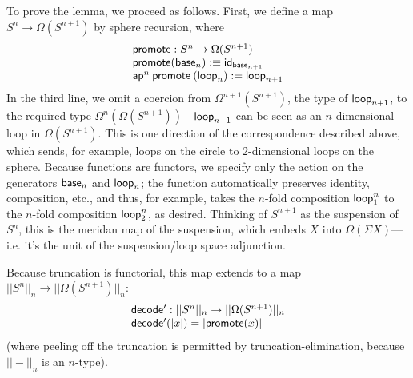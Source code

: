 To prove the lemma, we proceed as follows.  First, we define a map $S^n \to
\Omega(S^{n+1})$ by sphere recursion, where 
\[
\begin{array}{l}
\mathsf{promote} : S^n \to \Omega(S^{n+1}) \\
\mathsf{promote}(\mathsf{base}_n) :\equiv \mathsf{id}_{\mathsf{base}_{n+1}} \\
\mathsf{ap}^n \: \mathsf{promote} \: (\mathsf{loop}_n) := \mathsf{loop}_{n+1}
\end{array}
\]
In the third line, we omit a coercion from $\Omega^{n+1}(S^{n+1})$, the type
of $\mathsf{loop}_{n+1}$, to the required type $\Omega^n(\Omega(S^{n+1}))$---$\mathsf{loop}_{n+1}$ can be seen
as an $n$-dimensional loop in $\Omega(S^{n+1})$.
This is one direction of the correspondence described above, which
sends, for example, loops on the circle to 2-dimensional loops on the
sphere.  Because functions are functors, we specify only the action on
the generators $\mathsf{base}_n$ and $\mathsf{loop}_n$; the function automatically
preserves identity, composition, etc., and thus, for example, takes the $n$-fold
composition $\mathsf{loop}_1^n$ to the $n$-fold composition
$\mathsf{loop}_2^n$, as desired.  Thinking of $S^{n+1}$ as the
suspension of $S^n$, this is the meridan map of the
suspension, which embeds $X$ into $\Omega(\Sigma X)$---i.e. it's the unit of
the suspension/loop space adjunction.

Because truncation is functorial, this map extends to a map $||S^n||_n
\to ||\Omega(S^{n+1})||_n$:
\[
\begin{array}{l}
\mathsf{decode'} : ||S^n||_n \to ||\Omega(S^{n+1})||_n \\
\mathsf{decode'}(|x|) = |\mathsf{promote}(x)|
\end{array}
\]
(where peeling off the truncation is permitted by
truncation-elimination, because $||-||_n$ is an $n$-type).

